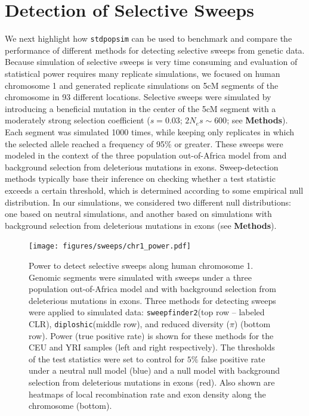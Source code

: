 \documentclass[hidelinks]{article}
\newcommand{\stdpopsim}{\texttt{stdpopsim}\xspace}
\newcommand{\sweepfinder}{\texttt{sweepfinder2}\xspace}
\newcommand{\diploshic}{\texttt{diploshic}\xspace}
\begin{document}
\section*{Detection of Selective Sweeps}
    \label{sweeps}
    We next highlight how \stdpopsim can be used to benchmark and compare
    the performance of different methods for detecting selective sweeps from genetic data.
    Because simulation of selective sweeps is very time consuming and evaluation of statistical power requires
    many replicate simulations, we focused on human chromosome 1 and generated replicate simulations on 5cM segments
    of the chromosome in 93 different locations. %
    Selective sweeps were simulated by introducing a beneficial mutation in the center of the 5cM segment
    with a moderately strong selection coefficient ($s = 0.03$; $2N_es \sim 600$; see \textbf{Methods}).
    Each segment was simulated 1000 times, while keeping only replicates in which the selected allele reached a frequency of 95\% or greater.
    These sweeps were modeled in the context of the three population out-of-Africa model from \citet{gutenkunst2009inferring}
    and background selection from deleterious mutations in exons.
    Sweep-detection methods typically base their inference on checking whether a test statistic
    exceeds a certain threshold, which is determined according to some empirical null distribution.
    In our simulations, we considered two different null distributions:
    one based on neutral simulations, and another based on simulations with background selection
    from deleterious mutations in exons (see \textbf{Methods}).

    \begin{figure}[b!]
        \centering
        \texttt{[image: figures/sweeps/chr1\_power.pdf]}
        \caption{
        Power to detect selective sweeps along human
        chromosome 1. Genomic segments were simulated with sweeps under a three population out-of-Africa model
        and with background selection from deleterious mutations in exons.
        Three methods for detecting sweeps were applied to simulated data:
        \sweepfinder (top row -- labeled CLR),
        \diploshic (middle row),
        and reduced diversity ($\pi$) (bottom row).
        Power (true positive rate) is shown for these methods for the CEU and YRI
        samples (left and right respectively).
        The thresholds of the test statistics were set to control for
        $5\%$ false positive rate under a neutral null model (blue)
        and a null model with background selection from deleterious mutations in exons (red).
        Also shown are heatmaps of local recombination rate and exon density along the
        chromosome (bottom).
        }
        \label{fig:chr1_power}
    \end{figure}
\end{document}

